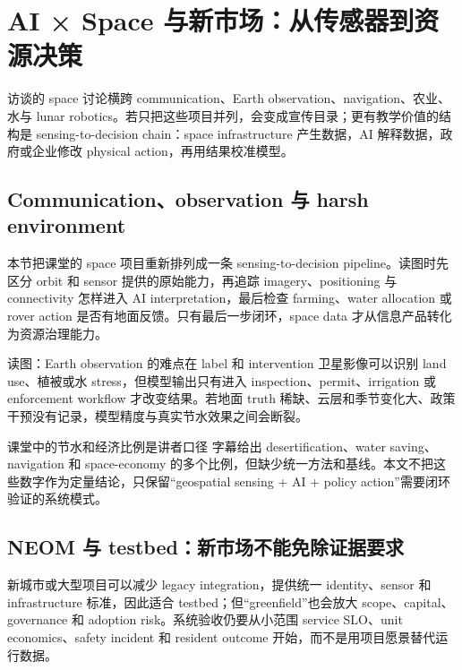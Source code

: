 \section{AI × Space 与新市场：从传感器到资源决策}

访谈的 space 讨论横跨 communication、Earth observation、navigation、农业、水与 lunar robotics。若只把这些项目并列，会变成宣传目录；更有教学价值的结构是 sensing-to-decision chain：space infrastructure 产生数据，AI 解释数据，政府或企业修改 physical action，再用结果校准模型。

\subsection{Communication、observation 与 harsh environment}

本节把课堂的 space 项目重新排列成一条 sensing-to-decision pipeline。读图时先区分 orbit 和 sensor 提供的原始能力，再追踪 imagery、positioning 与 connectivity 怎样进入 AI interpretation，最后检查 farming、water allocation 或 rover action 是否有地面反馈。只有最后一步闭环，space data 才从信息产品转化为资源治理能力。


\begin{knowledgebox}{读图：Earth observation 的难点在 label 和 intervention}
卫星影像可以识别 land use、植被或水 stress，但模型输出只有进入 inspection、permit、irrigation 或 enforcement workflow 才改变结果。若地面 truth 稀缺、云层和季节变化大、政策干预没有记录，模型精度与真实节水效果之间会断裂。
\end{knowledgebox}

\begin{warningbox}{课堂中的节水和经济比例是讲者口径}
字幕给出 desertification、water saving、navigation 和 space-economy 的多个比例，但缺少统一方法和基线。本文不把这些数字作为定量结论，只保留“geospatial sensing + AI + policy action”需要闭环验证的系统模式。
\end{warningbox}

\subsection{NEOM 与 testbed：新市场不能免除证据要求}

新城市或大型项目可以减少 legacy integration，提供统一 identity、sensor 和 infrastructure 标准，因此适合 testbed；但“greenfield”也会放大 scope、capital、governance 和 adoption risk。系统验收仍要从小范围 service SLO、unit economics、safety incident 和 resident outcome 开始，而不是用项目愿景替代运行数据。

